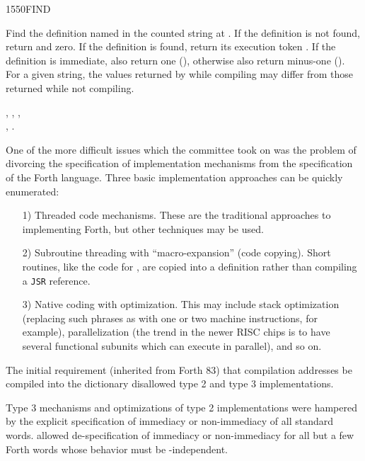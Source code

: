 \enlargethispage{4ex}
\begin{worddef}{1550}{FIND}
\item {}

	Find the definition named in the counted string at .
	If the definition is not found, return  and zero.
	If the definition is found, return its execution token .
	If the definition is immediate, also return one (),
	otherwise also return minus-one (). For a given string,
	the values returned by  while compiling may differ
	from those returned while not compiling.

\see {},
	,
	, \\
	,
	.

	\begin{rationale} %
		One of the more difficult issues which the committee took on
		was the problem of divorcing the specification of
		implementation mechanisms from the specification of the
		Forth language. Three basic implementation approaches can be
		quickly enumerated:

		\begin{enumerate}
		\item[1)] Threaded code mechanisms.
			These are the traditional approaches to implementing Forth,
			but other techniques may be used.

		\item[2)] Subroutine threading with ``macro-expansion'' (code
			copying). Short routines, like the code for ,
			are copied into a definition rather than compiling a
			\texttt{JSR} reference.

		\item[3)] Native coding with optimization.
			This may include stack optimization (replacing such phrases
			as   \word{+} with one or two machine
			instructions, for example), parallelization (the trend in
			the newer RISC chips is to have several functional subunits
			which can execute in parallel), and so on.
		\end{enumerate}

		The initial requirement (inherited from Forth 83) that
		compilation addresses be compiled into the dictionary
		disallowed type 2 and type 3 implementations.

		Type 3 mechanisms and optimizations of type 2 implementations
		were hampered by the explicit specification of immediacy or
		non-immediacy of all standard words.  allowed
		de-spec\-i\-fi\-ca\-tion of immediacy or non-immediacy for all but a
		few Forth words whose behavior must be -independent.


\end{rationale}
\end{worddef}
